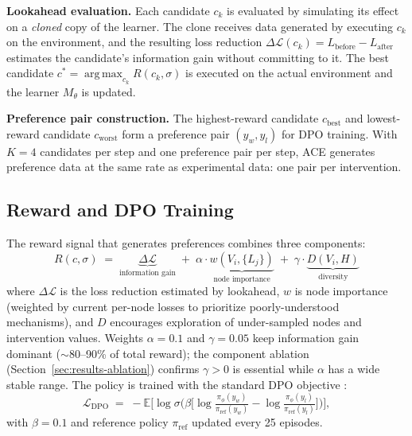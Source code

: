 \documentclass{article}
\DeclareMathOperator*{\argmax}{arg\,max}
\theoremstyle{plain}
\theoremstyle{definition}
\theoremstyle{remark}
\begin{document}
\textbf{Lookahead evaluation.} Each candidate $c_k$ is evaluated by simulating its effect on a \emph{cloned} copy of the learner. The clone receives data generated by executing $c_k$ on the environment, and the resulting loss reduction $\Delta\mathcal{L}(c_k) = L_\text{before} - L_\text{after}$ estimates the candidate's information gain without committing to it. The best candidate $c^* = \argmax_{c_k} R(c_k, \sigma)$ is executed on the actual environment and the learner $M_\theta$ is updated.

\textbf{Preference pair construction.} The highest-reward candidate $c_\text{best}$ and lowest-reward candidate $c_\text{worst}$ form a preference pair $(y_w, y_l)$ for DPO training. With $K=4$ candidates per step and one preference pair per step, ACE generates preference data at the same rate as experimental data: one pair per intervention.

\subsection{Reward and DPO Training}
\label{sec:dpo}

The reward signal that generates preferences combines three components:
\begin{equation}
\label{eq:reward}
R(c, \sigma) \;=\; \underbrace{\Delta\mathcal{L}}_{\text{information gain}} \;+\; \alpha \cdot \underbrace{w(V_i, \{L_j\})}_{\text{node importance}} \;+\; \gamma \cdot \underbrace{D(V_i, H)}_{\text{diversity}}
\end{equation}
where $\Delta\mathcal{L}$ is the loss reduction estimated by lookahead, $w$ is node importance (weighted by current per-node losses to prioritize poorly-understood mechanisms), and $D$ encourages exploration of under-sampled nodes and intervention values. Weights $\alpha = 0.1$ and $\gamma = 0.05$ keep information gain dominant ($\sim$80--90\% of total reward); the component ablation (Section~\ref{sec:results-ablation}) confirms $\gamma > 0$ is essential while $\alpha$ has a wide stable range. The policy is trained with the standard DPO objective \citep{rafailov2023direct}:
\begin{equation}
\label{eq:dpo-loss}
\mathcal{L}_{\text{DPO}} \;=\; -\mathbb{E}\Big[\log\sigma\Big(\beta\big[\log\tfrac{\pi_\phi(y_w)}{\pi_\text{ref}(y_w)} - \log\tfrac{\pi_\phi(y_l)}{\pi_\text{ref}(y_l)}\big]\Big)\Big],
\end{equation}
with $\beta = 0.1$ and reference policy $\pi_\text{ref}$ updated every 25 episodes.
\end{document}
